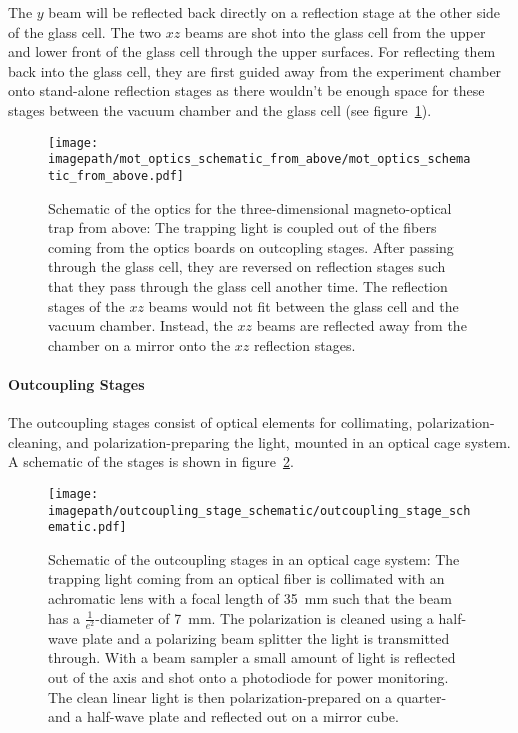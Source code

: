 The $y$ beam will be reflected back directly on a reflection stage at the other side of the glass cell. The two $xz$ beams are shot into the glass cell from the upper and lower front of the glass cell through the upper surfaces. For reflecting them back into the glass cell, they are first guided away from the experiment chamber onto stand-alone reflection stages as there wouldn't be enough space for these stages between the vacuum chamber and the glass cell (see figure~\ref{fig:mot_optics_schematic_from_above}).

\begin{figure}
    \centering
    \texttt{[image: \\imagepath/mot\_optics\_schematic\_from\_above/mot\_optics\_schematic\_from\_above.pdf]}
    \caption{Schematic of the optics for the three-dimensional magneto-optical trap from above: The trapping light is coupled out of the fibers coming from the optics boards on outcopling stages. After passing through the glass cell, they are reversed on reflection stages such that they pass through the glass cell another time. The reflection stages of the $xz$ beams would not fit between the glass cell and the vacuum chamber. Instead, the $xz$ beams are reflected away from the chamber on a mirror onto the $xz$ reflection stages.}
    \label{fig:mot_optics_schematic_from_above}
\end{figure}

\paragraph{Outcoupling Stages}
The outcoupling stages consist of optical elements for collimating, polarization-cleaning, and polarization-preparing the light, mounted in an optical cage system. A schematic of the stages is shown in figure~\ref{fig:outcoupling_stage_schematic}.

\begin{figure}
    \centering
    \texttt{[image: \\imagepath/outcoupling\_stage\_schematic/outcoupling\_stage\_schematic.pdf]}
    \caption{Schematic of the outcoupling stages in an optical cage system: The trapping light coming from an optical fiber is collimated with an achromatic lens with a focal length of \SI{35}{\milli\meter} such that the beam has a $\frac{1}{e^2}$-diameter of \SI{7}{\milli\meter}. The polarization is cleaned using a half-wave plate and a polarizing beam splitter the light is transmitted through. With a beam sampler a small amount of light is reflected out of the axis and shot onto a photodiode for power monitoring. The clean linear light is then polarization-prepared on a quarter- and a half-wave plate and reflected out on a mirror cube.}
    \label{fig:outcoupling_stage_schematic}
\end{figure}

